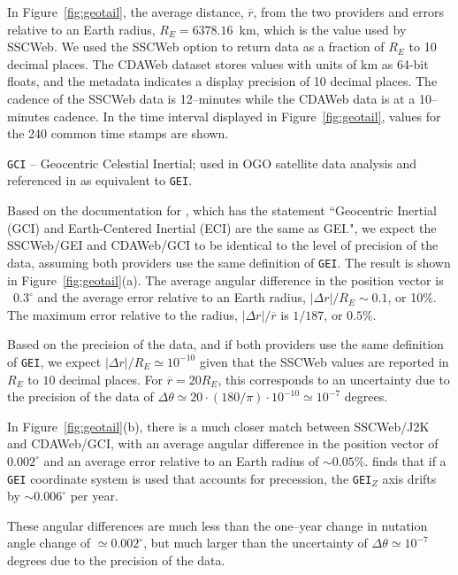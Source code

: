 \documentclass[draft]{agujournal2019}
\begin{document}
In Figure~\ref{fig:geotail}, the average distance, $\overline{r}$, from the two providers and errors relative to an Earth radius, $R_E=6378.16$~km, which is the value used by SSCWeb. We used the SSCWeb option to return data as a fraction of $R_E$ to 10 decimal places. The CDAWeb dataset stores values with units of km as 64-bit floats, and the metadata indicates a display precision of 10 decimal places. The cadence of the SSCWeb data is 12--minutes while the CDAWeb data is at a 10--minutes cadence. In the time interval displayed in Figure~\ref{fig:geotail}, values for the 240 common time stamps are shown.

\texttt{GCI} -- Geocentric Celestial Inertial; used in OGO satellite data analysis \cite{NTRS1970} and referenced in  as equivalent to \texttt{GEI}.

Based on the documentation for , which has the statement ``Geocentric Inertial (GCI) and Earth-Centered Inertial (ECI) are the same as GEI.", we expect the SSCWeb/GEI and CDAWeb/GCI to be identical to the level of precision of the data, assuming both providers use the same definition of \texttt{GEI}. The result is shown in Figure~\ref{fig:geotail}(a). The average angular difference in the position vector is ~$0.3^\circ$ and the average error relative to an Earth radius, $|\Delta r|/R_E\sim 0.1$, or 10\%. The maximum error relative to the radius, $|\Delta r|/\overline{r}$ is $1/187$, or $0.5$\%.

Based on the precision of the data, and if both providers use the same definition of \texttt{GEI}, we expect $|\Delta r|/R_E \simeq 10^{-10}$ given that the SSCWeb values are reported in $R_E$ to $10$ decimal places. For $\overline{r}=20 R_E$, this corresponds to an uncertainty due to the precision of the data of $\Delta \theta \simeq 20\cdot (180/\pi) \cdot 10^{-10} \simeq 10^{-7}$ degrees.


In Figure~\ref{fig:geotail}(b), there is a much closer match between SSCWeb/J2K and CDAWeb/GCI, with an average angular difference in the position vector of ~$0.002^\circ$ and an average error relative to an Earth radius of $\sim 0.05$\%. 
 finds that if a \texttt{GEI} coordinate system is used that accounts for precession, the \texttt{GEI}$_Z$ axis drifts by $\sim 0.006^\circ$ per year.

These angular differences are much less than the one--year change in nutation angle change of $\simeq 0.002^\circ$, but much larger than the uncertainty of $\Delta \theta \simeq 10^{-7}$ degrees due to the precision of the data.
\end{document}
